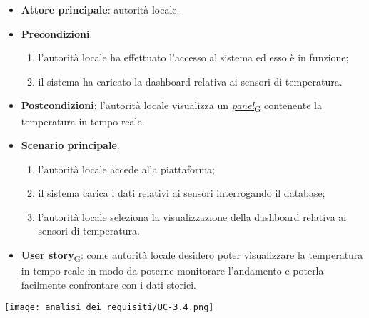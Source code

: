 \begin{itemize}
	\item \textbf{Attore principale}: autorità locale.
	\item \textbf{Precondizioni}:
	      \begin{enumerate}
		      \item l'autorità locale ha effettuato l'accesso al sistema ed esso è in funzione;
		      \item il sistema ha caricato la dashboard relativa ai sensori di temperatura.
	      \end{enumerate}
	\item \textbf{Postcondizioni}: l'autorità locale visualizza un \href{https://7last.github.io/docs/pb/documentazione-interna/glossario\#panel}{\textit{panel}\textsubscript{G}} contenente la temperatura in tempo reale.
	\item \textbf{Scenario principale}:
	      \begin{enumerate}
		      \item l'autorità locale accede alla piattaforma;
		      \item il sistema carica i dati relativi ai sensori interrogando il database;
		      \item l'autorità locale seleziona la visualizzazione della dashboard relativa ai sensori di temperatura.
	      \end{enumerate}
	\item \href{https://7last.github.io/docs/pb/documentazione-interna/glossario\#user-story}{\textbf{User story}\textsubscript{G}}:
	      come autorità locale desidero poter visualizzare la temperatura in tempo reale in modo da poterne monitorare l'andamento
	      e poterla facilmente confrontare con i dati storici.
\end{itemize}
\begin{center}
	\texttt{[image: analisi\_dei\_requisiti/UC-3.4.png]}
\end{center}


